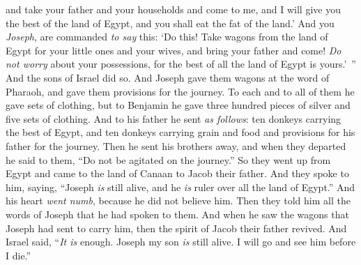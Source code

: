 \begin{biblechapter}
\verse and take your father and your households and come to me, and I will give you the best of the land of Egypt, and you shall eat the fat of the land.’
\verse And you \textit{Joseph}, are commanded \textit{to say} this: ‘Do this! Take wagons from the land of Egypt for your little ones and your wives, and bring your father and come!
\verse \textit{Do not worry} about your possessions, for the best of all the land of Egypt is yours.’ ”
\verse And the sons of Israel did so. And Joseph gave them wagons at the word of Pharaoh, and gave them provisions for the journey.
\verse To each and to all of them he gave sets of clothing, but to Benjamin he gave three hundred pieces of silver and five sets of clothing.
\verse And to his father he sent \textit{as follows}: ten donkeys carrying the best of Egypt, and ten donkeys carrying grain and food and provisions for his father for the journey.
\verse Then he sent his brothers away, and when they departed he said to them, “Do not be agitated on the journey.”
\verse So they went up from Egypt and came to the land of Canaan to Jacob their father.
\verse And they spoke to him, saying, “Joseph \textit{is} still alive, and he \textit{is} ruler over all the land of Egypt.” And his heart \textit{went numb}, because he did not believe him.
\verse Then they told him all the words of Joseph that he had spoken to them. And when he saw the wagons that Joseph had sent to carry him, then the spirit of Jacob their father revived.
\verse And Israel said, “\textit{It is} enough. Joseph my son \textit{is} still alive. I will go and see him before I die.”
\end{biblechapter}

